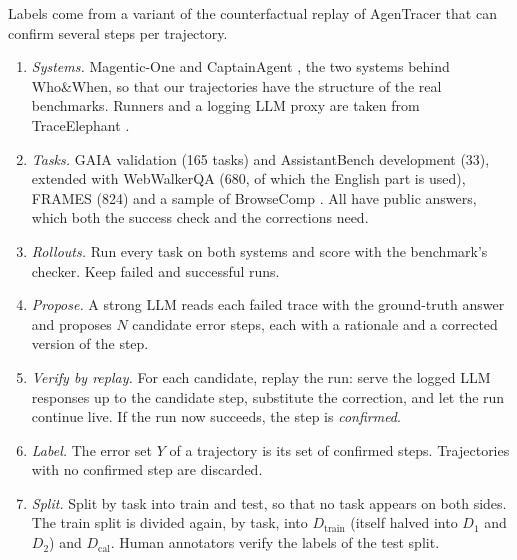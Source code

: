 \documentclass[10pt,a4paper]{article}
\newcommand{\Dtr}{D_{\mathrm{train}}}
\newcommand{\Dcal}{D_{\mathrm{cal}}}
\begin{document}
Labels come from a variant of the counterfactual replay of AgenTracer \cite{agentracer2026} that can confirm several steps per trajectory.
\begin{enumerate}
\item \emph{Systems.} Magentic-One \cite{fourney2024magentic} and CaptainAgent \cite{song2024captain}, the two systems behind Who\&When, so that our trajectories have the structure of the real benchmarks. Runners and a logging LLM proxy are taken from TraceElephant \cite{traceelephant2026}.
\item \emph{Tasks.} GAIA validation \cite{mialon2024gaia} (165 tasks) and AssistantBench development \cite{yoran2024assistantbench} (33), extended with WebWalkerQA \cite{wu2025webwalker} (680, of which the English part is used), FRAMES \cite{krishna2024frames} (824) and a sample of BrowseComp \cite{wei2025browsecomp}. All have public answers, which both the success check and the corrections need.
\item \emph{Rollouts.} Run every task on both systems and score with the benchmark's checker. Keep failed and successful runs.
\item \emph{Propose.} A strong LLM reads each failed trace with the ground-truth answer and proposes $N$ candidate error steps, each with a rationale and a corrected version of the step.
\item \emph{Verify by replay.} For each candidate, replay the run: serve the logged LLM responses up to the candidate step, substitute the correction, and let the run continue live. If the run now succeeds, the step is \emph{confirmed}.
\item \emph{Label.} The error set $Y$ of a trajectory is its set of confirmed steps. Trajectories with no confirmed step are discarded.
\item \emph{Split.} Split by task into train and test, so that no task appears on both sides. The train split is divided again, by task, into $\Dtr$ (itself halved into $D_1$ and $D_2$) and $\Dcal$. Human annotators verify the labels of the test split.
\end{enumerate}
\end{document}
